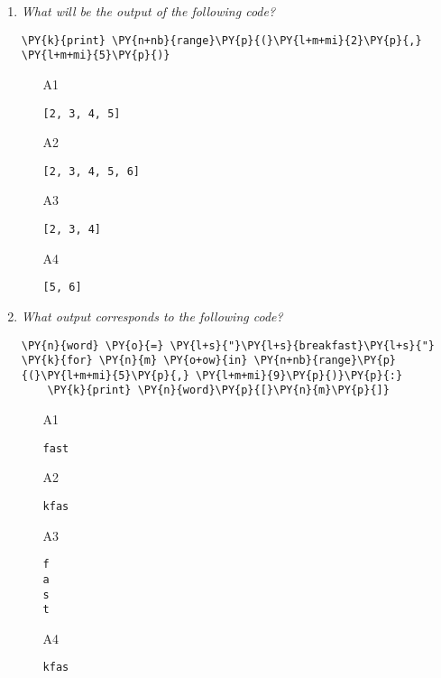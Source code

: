 \begin{enumerate}
\vspace{6mm}

\item {\em What will be the output of the following code?}\\

\begin{Verbatim}[commandchars=\\\{\}]
\PY{k}{print} \PY{n+nb}{range}\PY{p}{(}\PY{l+m+mi}{2}\PY{p}{,} \PY{l+m+mi}{5}\PY{p}{)}
\end{Verbatim}
\vspace{6mm}

\begin{enumerate}
\item[A1] 
\begin{verbatim}
[2, 3, 4, 5]
\end{verbatim}
\item[A2] 
\begin{verbatim}
[2, 3, 4, 5, 6]
\end{verbatim}
\item[A3] 
\begin{verbatim}
[2, 3, 4]
\end{verbatim}
\item[A4] 
\begin{verbatim}
[5, 6]
\end{verbatim}
\end{enumerate}

\vspace{6mm}

\item {\em What output corresponds to the following code?}\\

\begin{Verbatim}[commandchars=\\\{\}]
\PY{n}{word} \PY{o}{=} \PY{l+s}{"}\PY{l+s}{breakfast}\PY{l+s}{"}
\PY{k}{for} \PY{n}{m} \PY{o+ow}{in} \PY{n+nb}{range}\PY{p}{(}\PY{l+m+mi}{5}\PY{p}{,} \PY{l+m+mi}{9}\PY{p}{)}\PY{p}{:}
    \PY{k}{print} \PY{n}{word}\PY{p}{[}\PY{n}{m}\PY{p}{]}
\end{Verbatim}
\vspace{6mm}

\begin{enumerate}
\item[A1] 
\begin{verbatim}
fast
\end{verbatim}
\item[A2] 
\begin{verbatim}
kfas
\end{verbatim}
\item[A3] 
\begin{verbatim}
f
a
s
t
\end{verbatim}
\item[A4] 
\begin{verbatim}
kfas
\end{verbatim}
\end{enumerate}

\vspace{6mm}

\end{enumerate}

